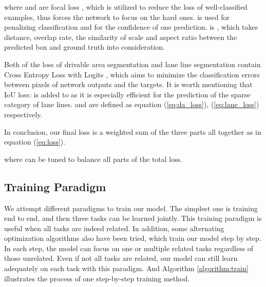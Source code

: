 \documentclass[10pt,twocolumn,letterpaper]{article}
\begin{document}
where  and  are focal loss \cite{focalloss}, which is utilized to reduce the loss of well-classified examples, thus forces the network to focus on the hard ones.  is used for penalizing classification and  for the confidence of one prediction.  is   \cite{d/ciouloss}, which takes distance, overlap rate, the similarity of scale and aspect ratio between the predicted box and ground truth into consideration.

Both of the loss of drivable area segmentation  and lane line segmentation  contain Cross Entropy Loss with Logits , which aims to minimize the classification errors between pixels of network outputs and the targets. It is worth mentioning that IoU loss:  is added to  as it is especially efficient for the prediction of the sparse category of lane lines.  and   are defined as equation (\ref{eq:da_loss}), (\ref{eq:lane_loss}) respectively.



In conclusion, our final loss is a weighted sum of the three parts all together as in equation (\ref{eq:loss}).

where   can be tuned to balance all parts of the total loss.

\subsection{Training Paradigm}

We attempt different paradigms to train our model. The simplest one is training end to end, and then three tasks can be learned jointly. This training paradigm is useful when all tasks are indeed related. In addition, some alternating optimization algorithms also have been tried, which train our model step by step. In each step, the model can focus on one or multiple related tasks regardless of those unrelated. Even if not all tasks are related, our model can still learn adequately on each task with this paradigm. And Algorithm \ref{algorithm:train} illustrates the process of one step-by-step training method.
\end{document}
